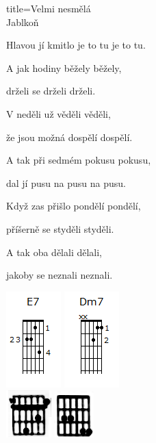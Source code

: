 \begin{song}{title=\centering Velmi nesmělá \\\normalsize Jablkoň  \vspace*{-0.3cm}}
{\begin{minipage}[t]{0.48\textwidth}
	Hlavou jí kmitlo je to tu je to tu.
	
	A jak hodiny běžely běžely,
	
	drželi se drželi drželi.

\end{minipage}\begin{minipage}[t]{0.48\textwidth}\setlength{\parindent}{0.45cm}\vspace*{0.55cm}  %

	
\sloka
	V neděli už věděli věděli,

	že jsou možná dospělí dospělí.
	
	A tak při sedmém pokusu pokusu,
	
	dal jí pusu na pusu na pusu.


\sloka
	Když zas přišlo pondělí pondělí,
	
	příšerně se styděli styděli.
	
	A tak oba dělali dělali,
	
	jakoby se neznali neznali.



\includegraphics[scale=1.5]{../Akordy/e7.png}
\includegraphics[scale=1.5]{../Akordy/dm7.png}\\
\phantom{dfdfdf}\includegraphics[scale=1.2]{../Akordy/esm7.png}
\phantom{dfdfdf}\includegraphics[scale=1.2]{../Akordy/em72.png}



\end{minipage}
}
\setcounter{Slokočet}{0}
\end{song}

